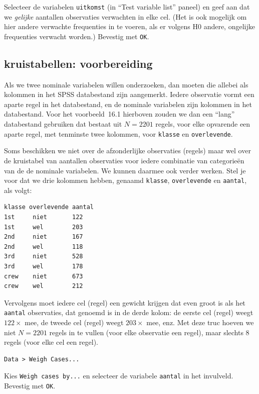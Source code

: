 \documentclass[
]{book}
\begin{document}
Selecteer de variabelen \texttt{uitkomst} (in ``Test variable list'' paneel) en
geef aan dat we \emph{gelijke} aantallen observaties verwachten in elke cel.
(Het is ook mogelijk om hier andere verwachte frequenties in te voeren,
als er volgens H0 andere, ongelijke frequenties verwacht worden.)
Bevestig met \texttt{OK}.

\hypertarget{kruistabellen-voorbereiding}{%
\subsection{kruistabellen: voorbereiding}\label{kruistabellen-voorbereiding}}

Als we twee nominale variabelen willen onderzoeken, dan moeten die
allebei als kolommen in het SPSS databestand zijn aangemerkt. Iedere
observatie vormt een aparte regel in het databestand, en de nominale
variabelen zijn kolommen in het databestand. Voor het
voorbeeld~16.1 hierboven zouden we dan een ``lang'' databestand
gebruiken dat bestaat uit \(N=2201\) regels, voor elke opvarende een
aparte regel, met tenminste twee kolommen, voor \texttt{klasse} en
\texttt{overlevende}.

Soms beschikken we niet over de afzonderlijke observaties (regels) maar
wel over de kruistabel van aantallen observaties voor iedere combinatie
van categorieën van de de nominale variabelen. We kunnen daarmee ook
verder werken. Stel je voor dat we drie kolommen hebben, genaamd
\texttt{klasse}, \texttt{overlevende} en \texttt{aantal}, als volgt:

\begin{verbatim}
klasse overlevende aantal
1st     niet       122
1st     wel        203
2nd     niet       167
2nd     wel        118
3rd     niet       528
3rd     wel        178
crew    niet       673
crew    wel        212
\end{verbatim}

Vervolgens moet iedere cel (regel) een gewicht krijgen dat even groot is
als het \texttt{aantal} observaties, dat genoemd is in de derde kolom: de
eerste cel (regel) weegt \(122\times\) mee, de tweede cel (regel) weegt
\(203\times\) mee, enz. Met deze truc hoeven we niet \(N=2201\) regels in te
vullen (voor elke observatie een regel), maar slechts 8 regels (voor
elke cel een regel).

\begin{verbatim}
Data > Weigh Cases... 
\end{verbatim}

Kies \texttt{Weigh\ cases\ by...} en selecteer de variabele \texttt{aantal} in
het invulveld. Bevestig met \texttt{OK}.
\end{document}

